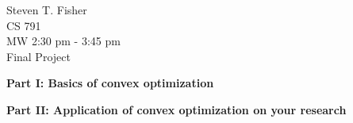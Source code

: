 \documentclass{article}
\newcommand{\src}[1]{}
\begin{document}
	\begin{flushright}
		Steven T. Fisher\\
		CS 791\\
		MW 2:30 pm - 3:45 pm\\
		Final Project
	\end{flushright}
        \renewcommand\qedsymbol{}
        
\textbf{Part I: Basics of convex optimization}
\src{projq1}
\newpage
\src{projq2}
\newpage
\src{projq3}
\newpage
\src{projq4}
\newpage
\src{projq5}
\newpage
\textbf{Part II: Application of convex optimization on your research}
\src{part2}

\src{append}
\end{document}
